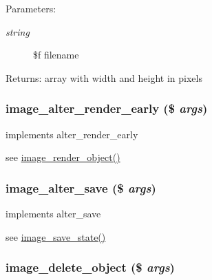 \begin{Desc}
\item[Parameters:]
\begin{description}
\item[{\em string}]\$f filename\end{description}
\end{Desc}
\begin{Desc}
\item[Returns:]array with width and height in pixels \end{Desc}
\hypertarget{module__image_8inc_8php_b52d6b71a5c26dbb7e86653652a23251}{
\subsubsection[{image\_\-alter\_\-render\_\-early}]{\setlength{\rightskip}{0pt plus 5cm}image\_\-alter\_\-render\_\-early (\$ {\em args})}}
\label{module__image_8inc_8php_b52d6b71a5c26dbb7e86653652a23251}


implements alter\_\-render\_\-early

see \hyperlink{module__image_8inc_8php_4fadded2a225d1b5ea73404a84597620}{image\_\-render\_\-object()} \hypertarget{module__image_8inc_8php_93578776fb38b10d47bc711cc3469ae9}{
\subsubsection[{image\_\-alter\_\-save}]{\setlength{\rightskip}{0pt plus 5cm}image\_\-alter\_\-save (\$ {\em args})}}
\label{module__image_8inc_8php_93578776fb38b10d47bc711cc3469ae9}


implements alter\_\-save

see \hyperlink{module__image_8inc_8php_c26ea1448f0b7ed835907cf7c22b60ca}{image\_\-save\_\-state()} \hypertarget{module__image_8inc_8php_7cbcf6138ccff16a8b733cfd6f0f1666}{
\subsubsection[{image\_\-delete\_\-object}]{\setlength{\rightskip}{0pt plus 5cm}image\_\-delete\_\-object (\$ {\em args})}}
\label{module__image_8inc_8php_7cbcf6138ccff16a8b733cfd6f0f1666}


